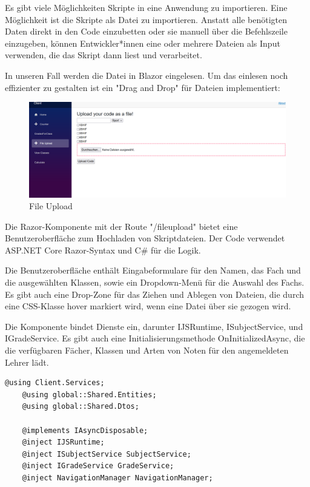 \newpage
Es gibt viele Möglichkeiten Skripte in eine Anwendung zu importieren.
Eine Möglichkeit ist die Skripte als Datei zu importieren.
Anstatt alle benötigten Daten direkt in den Code einzubetten oder sie manuell über die Befehlszeile einzugeben, 
können Entwickler*innen eine oder mehrere Dateien als Input verwenden, die das Skript dann liest und verarbeitet.

In unseren Fall werden die Datei in Blazor eingelesen.
Um das einlesen noch effizienter zu gestalten ist ein "Drag and Drop" für Dateien implementiert:

\begin{figure}[H]
    \centering
    \includegraphics[scale=0.5]{pics/FileUpload.png}
    \caption{File Upload}
    \label{fig:impl:fileupload}
\end{figure}


Die Razor-Komponente mit der Route "/fileupload" bietet eine Benutzeroberfläche zum Hochladen von Skriptdateien. Der Code verwendet ASP.NET Core Razor-Syntax und C\# für die Logik.

Die Benutzeroberfläche enthält Eingabeformulare für den Namen, das Fach und die ausgewählten Klassen, sowie ein Dropdown-Menü für die Auswahl des Fachs. Es gibt auch eine Drop-Zone für das Ziehen und Ablegen von Dateien, die durch eine CSS-Klasse hover markiert wird, wenn eine Datei über sie gezogen wird.

Die Komponente bindet Dienste ein, darunter IJSRuntime, ISubjectService, und IGradeService. Es gibt auch eine Initialisierungsmethode OnInitializedAsync, die die verfügbaren Fächer, Klassen und Arten von Noten für den angemeldeten Lehrer lädt.
\begin{lstlisting}[language={[Sharp]C}, caption=Code for FileUploadUsing, label=lst:imp:flUsing]
    @using Client.Services;
    @using global::Shared.Entities;
    @using global::Shared.Dtos;
    
    @implements IAsyncDisposable;
    @inject IJSRuntime;
    @inject ISubjectService SubjectService;
    @inject IGradeService GradeService; 
    @inject NavigationManager NavigationManager;
    
\end{lstlisting}
    

